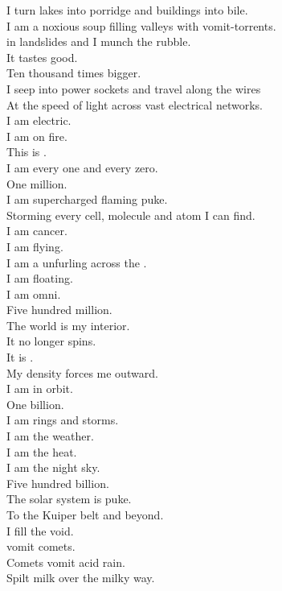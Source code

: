 I turn lakes into porridge and buildings into bile. \\
I am a noxious soup filling valleys with vomit-torrents. \\
 in landslides and I munch the rubble. \\
It tastes good. \\

Ten thousand times bigger. \\
I seep into power sockets and travel along the wires \\
At the speed of light across vast electrical networks. \\
I am electric. \\
I am on fire. \\
This is . \\
I am every one and every zero. \\

One million. \\
I am supercharged flaming puke. \\
Storming every cell, molecule and atom I can find. \\
I am cancer. \\
I am flying. \\
I am a  unfurling across the . \\
I am floating. \\
I am omni. \\

Five hundred million. \\
The world is my interior. \\
It no longer spins. \\
It is . \\
My density forces me outward. \\
I am in orbit. \\

One billion. \\
I am  rings and  storms. \\
I am the weather. \\
I am the  heat. \\
I am the night sky. \\

Five hundred billion. \\
The solar system is puke. \\
To the Kuiper belt and beyond. \\
I fill the void. \\
 vomit comets. \\
Comets vomit acid rain. \\
Spilt milk over the milky way. \\

